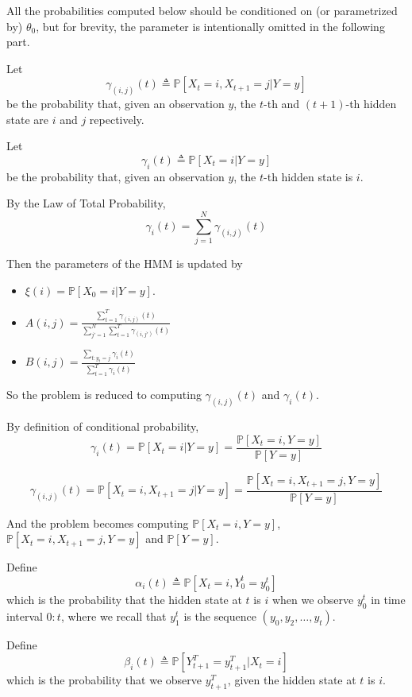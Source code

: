         All the probabilities computed below should be conditioned on (or parametrized by) $\theta_0$, but for brevity, the parameter is intentionally omitted in the following part. 
        
        Let
        \[ \gamma_{(i,j)}(t) \triangleq \mathbb{P}[X_t=i, X_{t+1}=j | Y=y] \]
        be the probability that, given an observation $y$, the $t$-th and $(t+1)$-th hidden state are $i$ and $j$ repectively.
    
        Let
        \[ \gamma_i(t) \triangleq \mathbb{P}[X_t=i|Y=y] \]
        be the probability that, given an observation $y$, the $t$-th hidden state is $i$.
    
        By the Law of Total Probability,
        \[ \gamma_i(t) = \sum_{j=1}^N \gamma_{(i,j)}(t) \]
    
        Then the parameters of the HMM is updated by
        \begin{itemize}
            \item $\xi(i) = \mathbb{P}[X_0=i|Y=y]$.
            \item $A(i,j) = \frac{\sum_{t=1}^T \gamma_{(i,j)}(t)}{\sum_{j'=1}^N\sum_{t=1}^T\gamma_{(i,j')}(t)}$
            \item $B(i,j) = \frac{\sum_{t:y_t=j}\gamma_i(t)}{\sum_{t=1}^T\gamma_i(t)}$
        \end{itemize}
    
        So the problem is reduced to computing $\gamma_{(i,j)}(t)$ and $\gamma_i(t)$.
    
        By definition of conditional probability,
        \[ \gamma_i(t) = \mathbb{P}[X_t=i|Y=y] = \frac{\mathbb{P}[X_t=i, Y=y]}{\mathbb{P}[Y=y]} \]
    
        \[ \gamma_{(i,j)}(t) = \mathbb{P}[X_t=i, X_{t+1}=j|Y=y] = \frac{\mathbb{P}[X_t=i, X_{t+1}=j, Y=y]}{\mathbb{P}[Y=y]} \]
    
        And the problem becomes computing $\mathbb{P}[X_t=i, Y=y]$, $\mathbb{P}[X_t=i,X_{t+1}=j, Y=y]$ and $\mathbb{P}[Y=y]$.
    
        Define
        \[ \alpha_i(t) \triangleq \mathbb{P}[X_t=i, Y_0^t=y_0^t] \]
        which is the probability that the hidden state at $t$ is $i$ when we observe $y_0^t$ in time interval $0:t$, where we recall that $y_1^t$ is the sequence $(y_0,y_2,\dots,y_t)$.
    
        Define
        \[\beta_i(t) \triangleq \mathbb{P}[Y_{t+1}^T=y_{t+1}^T|X_t=i] \]
        which is the probability that we observe $y_{t+1}^T$, given the hidden state at $t$ is $i$.
    
